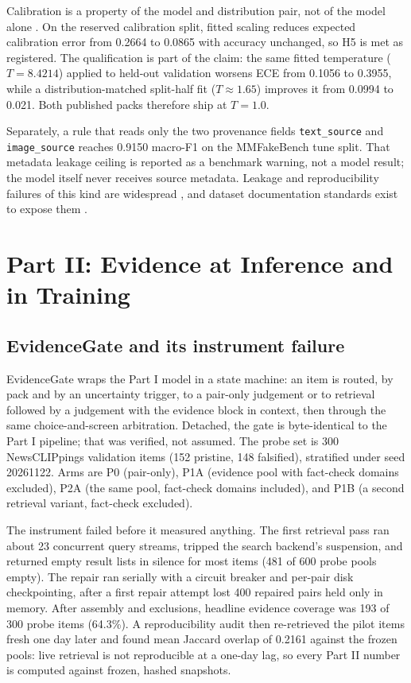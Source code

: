\documentclass[conference]{IEEEtran}
\begin{document}
Calibration is a property of the model and distribution pair, not of the model alone \cite{Guo2017CalibrationModern,Ovadia2019CanYou,Minderer2021RevisitingCalibration}. On the reserved calibration split, fitted scaling reduces expected calibration error from 0.2664 to 0.0865 with accuracy unchanged, so H5 is met as registered. The qualification is part of the claim: the same fitted temperature ($T=8.4214$) applied to held-out validation worsens ECE from 0.1056 to 0.3955, while a distribution-matched split-half fit ($T\approx1.65$) improves it from 0.0994 to 0.021. Both published packs therefore ship at $T=1.0$.

Separately, a rule that reads only the two provenance fields \texttt{text\_source} and \texttt{image\_source} reaches 0.9150 macro-F1 on the MMFakeBench tune split. That metadata leakage ceiling is reported as a benchmark warning, not a model result; the model itself never receives source metadata. Leakage and reproducibility failures of this kind are widespread \cite{Gururangan2018AnnotationArtifacts,Kapoor2023LeakageReproducibility,Pineau2020ImprovingReproducibility}, and dataset documentation standards exist to expose them \cite{Gebru2018DatasheetsDatasets}.

\section{Part II: Evidence at Inference and in Training}
\label{sec:part2}

\subsection{EvidenceGate and its instrument failure}

EvidenceGate wraps the Part I model in a state machine: an item is routed, by pack and by an uncertainty trigger, to a pair-only judgement or to retrieval followed by a judgement with the evidence block in context, then through the same choice-and-screen arbitration. Detached, the gate is byte-identical to the Part I pipeline; that was verified, not assumed. The probe set is 300 NewsCLIPpings validation items (152 pristine, 148 falsified), stratified under seed 20261122. Arms are P0 (pair-only), P1A (evidence pool with fact-check domains excluded), P2A (the same pool, fact-check domains included), and P1B (a second retrieval variant, fact-check excluded).

The instrument failed before it measured anything. The first retrieval pass ran about 23 concurrent query streams, tripped the search backend's suspension, and returned empty result lists in silence for most items (481 of 600 probe pools empty). The repair ran serially with a circuit breaker and per-pair disk checkpointing, after a first repair attempt lost 400 repaired pairs held only in memory. After assembly and exclusions, headline evidence coverage was 193 of 300 probe items (64.3\%). A reproducibility audit then re-retrieved the pilot items fresh one day later and found mean Jaccard overlap of 0.2161 against the frozen pools: live retrieval is not reproducible at a one-day lag, so every Part II number is computed against frozen, hashed snapshots.
\end{document}
